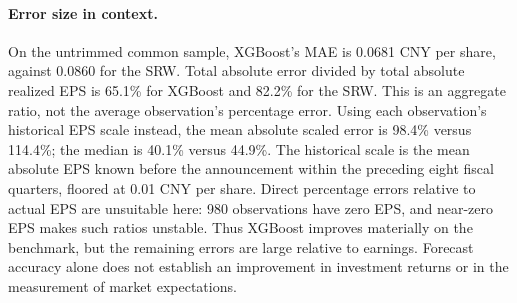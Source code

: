 \paragraph{Error size in context.} On the untrimmed common sample, XGBoost's MAE is
0.0681 CNY per share, against 0.0860 for the SRW. Total absolute error divided by
total absolute realized EPS is 65.1\% for XGBoost and
82.2\% for the SRW. This is an aggregate ratio, not the average observation's
percentage error. Using each observation's historical EPS scale instead, the mean absolute scaled error is
98.4\% versus 114.4\%; the median is
40.1\% versus 44.9\%.
The historical scale is the mean absolute EPS known before the announcement within the preceding eight fiscal
quarters, floored at 0.01 CNY per share. Direct percentage errors relative to actual EPS are unsuitable here:
980 observations have zero EPS, and near-zero EPS makes such ratios unstable.
Thus XGBoost improves materially on the benchmark, but the remaining errors are large relative to earnings.
Forecast accuracy alone does not establish an improvement in investment returns or in the measurement of market expectations.
